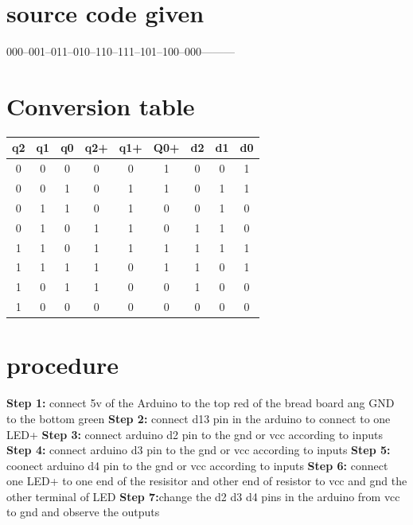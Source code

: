 \documentclass[10pt, a4paper]{article}
\begin{document}
\section{source code given}
000--001--011--010--110--111--101--100--000---------

\section{Conversion table}

    \centering
\begin{tabular}{ |c |c |c |c |c |c |c |c |c |}
\hline
\newline
\textbf{q2} & \textbf{q1} & \textbf{q0} & \textbf{q2+} & \textbf{q1+} & \textbf{Q0+} & \textbf{d2}& \textbf{d1}& \textbf{d0}\\
\hline
 0 & 0 & 0 &0 & 0 & 1 &0 & 0 &1 \\  
 0 & 0 & 1 &0 & 1 & 1 &0 & 1 &1\\ 
 0 & 1 & 1 &0 & 1 & 0 &0 & 1 &0\\ 
 0 & 1 & 0 &1 & 1 & 0 &1 & 1 &0\\ 
 1 & 1 & 0 &1 & 1 & 1 &1 & 1 &1\\ 
 1 & 1 & 1 &1 & 0 & 1 &1 & 0 &1\\ 
 1 & 0 & 1 &1 & 0 & 0 &1 & 0 &0\\ 
 1 & 0 & 0 &0 & 0 & 0 &0 & 0 &0\\ 
 \hline
 \end{tabular}
\label{conversion table}
\section*{procedure}
\textbf{Step 1:} connect 5v of the Arduino to the top red of the bread board ang GND to the bottom green
\hfill \break
\textbf{Step 2:} connect d13 pin in the arduino to connect to one LED+
\hfill \break
\textbf{Step 3:} connect arduino d2 pin to the gnd or vcc according to inputs
\hfill \break
\textbf{Step 4:} connect arduino d3 pin to the gnd or vcc according to inputs
\hfill \break
\textbf{Step 5:} coonect arduino d4 pin to the gnd or vcc according to inputs
\hfill \break
\textbf{Step 6:} connect one LED+ to one end of the resisitor and other end of resistor to vcc and gnd the other terminal of LED
\hfill \break
\textbf{Step 7:}change the d2 d3 d4 pins in the arduino from vcc to gnd and observe the outputs
\hfill \break
\end{document}
